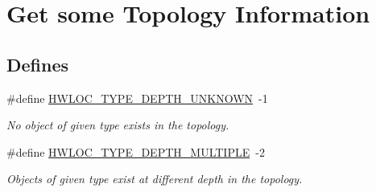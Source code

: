 \hypertarget{group__hwlocality__information}{
\section{Get some Topology Information}
\label{group__hwlocality__information}
}
\subsection*{Defines}
\begin{CompactItemize}
\item 
\#define \hyperlink{group__hwlocality__information_g9e86ce528f626330de2da7adb6c4e02e}{HWLOC\_\-TYPE\_\-DEPTH\_\-UNKNOWN}~-1
\begin{CompactList}\small\item\em No object of given type exists in the topology. \item\end{CompactList}\item 
\#define \hyperlink{group__hwlocality__information_g64c80d3e0501b321d217b1642d68e23d}{HWLOC\_\-TYPE\_\-DEPTH\_\-MULTIPLE}~-2
\begin{CompactList}\small\item\em Objects of given type exist at different depth in the topology. \item\end{CompactList}\end{CompactItemize}
